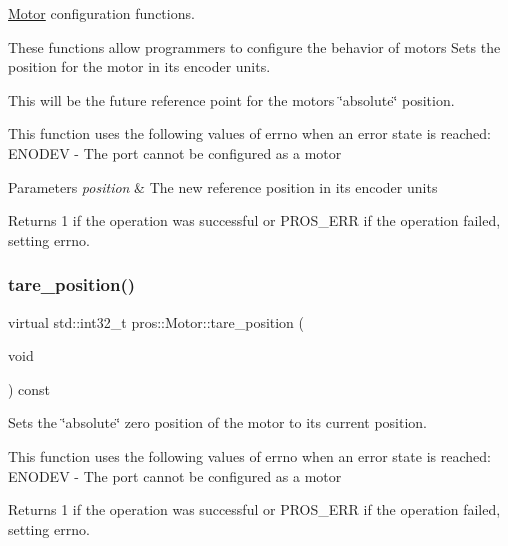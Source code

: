 \hyperlink{classpros_1_1Motor}{Motor} configuration functions. 

These functions allow programmers to configure the behavior of motors Sets the position for the motor in its encoder units.

This will be the future reference point for the motor\textquotesingle{}s \char`\"{}absolute\char`\"{} position.

This function uses the following values of errno when an error state is reached\+: E\+N\+O\+D\+EV -\/ The port cannot be configured as a motor


\begin{DoxyParams}{Parameters}
{\em position} & The new reference position in its encoder units\\
\hline
\end{DoxyParams}
\begin{DoxyReturn}{Returns}
1 if the operation was successful or P\+R\+O\+S\+\_\+\+E\+RR if the operation failed, setting errno. 
\end{DoxyReturn}
\mbox{\label{classpros_1_1Motor_a5d67803a65fa699a169a4ed5a107a964}} 
\subsubsection{\texorpdfstring{tare\+\_\+position()}{tare\_position()}}
{\footnotesize\ttfamily virtual std\+::int32\+\_\+t pros\+::\+Motor\+::tare\+\_\+position (\begin{DoxyParamCaption}\item[{void}]{ }\end{DoxyParamCaption}) const\hspace{0.3cm}{\ttfamily [virtual]}}



Sets the \char`\"{}absolute\char`\"{} zero position of the motor to its current position. 

This function uses the following values of errno when an error state is reached\+: E\+N\+O\+D\+EV -\/ The port cannot be configured as a motor

\begin{DoxyReturn}{Returns}
1 if the operation was successful or P\+R\+O\+S\+\_\+\+E\+RR if the operation failed, setting errno. 
\end{DoxyReturn}
\mbox{\label{classpros_1_1Motor_ab51969169dc534537f79710261daa3dd}} 
